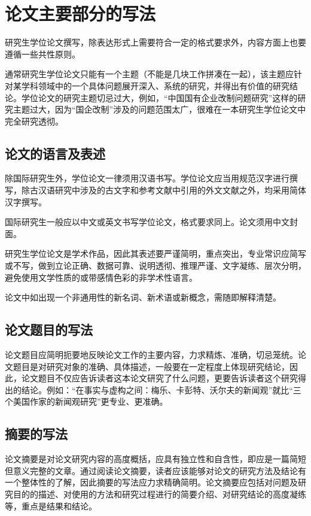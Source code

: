 
\chapter{论文主要部分的写法}
研究生学位论文撰写，除表达形式上需要符合一定的格式要求外，内容方面上也要遵循一些共性原则。

通常研究生学位论文只能有一个主题（不能是几块工作拼凑在一起），该主题应针对某学科领域中的一个具体问题展开深入、系统的研究，并得出有价值的研究结论。学位论文的研究主题切忌过大，例如，“中国国有企业改制问题研究”这样的研究主题过大，因为“国企改制”涉及的问题范围太广，很难在一本研究生学位论文中完全研究透彻。

\section{论文的语言及表述}
除国际研究生外，学位论文一律须用汉语书写。学位论文应当用规范汉字进行撰写，除古汉语研究中涉及的古文字和参考文献中引用的外文文献之外，均采用简体汉字撰写。

国际研究生一般应以中文或英文书写学位论文，格式要求同上。论文须用中文封面。

研究生学位论文是学术作品，因此其表述要严谨简明，重点突出，专业常识应简写或不写，做到立论正确、数据可靠、说明透彻、推理严谨、文字凝练、层次分明，避免使用文学性质的或带感情色彩的非学术性语言。

论文中如出现一个非通用性的新名词、新术语或新概念，需随即解释清楚。

\section{论文题目的写法}
论文题目应简明扼要地反映论文工作的主要内容，力求精炼、准确，切忌笼统。论文题目是对研究对象的准确、具体描述，一般要在一定程度上体现研究结论，因此，论文题目不仅应告诉读者这本论文研究了什么问题，更要告诉读者这个研究得出的结论。例如：“在事实与虚构之间：梅乐、卡彭特、沃尔夫的新闻观”就比“三个美国作家的新闻观研究”更专业、更准确。

\section{摘要的写法}
论文摘要是对论文研究内容的高度概括，应具有独立性和自含性，即应是一篇简短但意义完整的文章。通过阅读论文摘要，读者应该能够对论文的研究方法及结论有一个整体性的了解，因此摘要的写法应力求精确简明。论文摘要应包括对问题及研究目的的描述、对使用的方法和研究过程进行的简要介绍、对研究结论的高度凝练等，重点是结果和结论。

